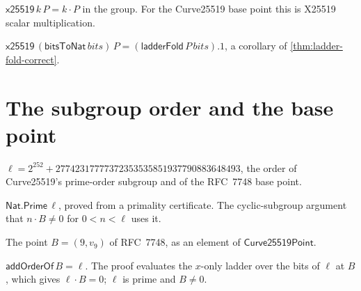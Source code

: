 \begin{definition}
  \label{def:x25519}
  \leanok
  $\mathsf{x25519}\,k\,P = k \cdot P$ in the group. For the Curve25519
  base point this is X25519 scalar multiplication.
\end{definition}

\begin{theorem}
  \label{thm:x25519-eq-ladder}
  \leanok
  $\mathsf{x25519}\,(\mathsf{bitsToNat}\,bits)\,P
     = (\mathsf{ladderFold}\,P\,bits).1$, a corollary of
  \ref{thm:ladder-fold-correct}.
\end{theorem}

\section{The subgroup order and the base point}

\begin{definition}
  \label{def:curve25519-suborder}
  \leanok
  $\ell = 2^{252} + 27742317777372353535851937790883648493$, the order of
  Curve25519's prime-order subgroup and of the RFC~7748 base point.
\end{definition}

\begin{theorem}
  \label{def:curve25519-suborder-prime}
  \leanok
  $\mathsf{Nat.Prime}\,\ell$, proved from a primality certificate. The
  cyclic-subgroup argument that $n\cdot B \neq 0$ for $0 < n < \ell$ uses it.
\end{theorem}

\begin{definition}
  \label{def:curve25519-basepoint}
  \leanok
  The point $B = (9, v_9)$ of RFC~7748, as an element of
  $\mathsf{Curve25519Point}$.
\end{definition}

\begin{theorem}
  \label{def:curve25519-basepoint-addorder}
  \leanok
  $\mathsf{addOrderOf}\,B = \ell$. The proof evaluates the $x$-only ladder
  over the bits of $\ell$ at $B$, which gives $\ell \cdot B = 0$; $\ell$ is
  prime and $B \neq 0$.
\end{theorem}

